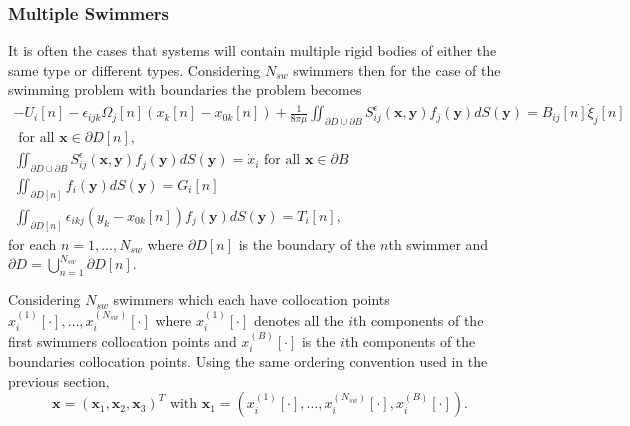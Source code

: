 \subsubsection{Multiple Swimmers} \label{sec:multipleSwimmers}
It is often the cases that systems will contain multiple rigid bodies of either the same type or different types. Considering $N_{sw}$ swimmers then for the case of the swimming problem with boundaries the problem becomes
\begin{equation}
\label{eq:swimmingProblemMulti}
\begin{gathered}
    -U_{i}[n]-\epsilon_{i j k} \Omega_{j}[n]\left(x_{k}[n]-x_{0 k}[n]\right)+\frac{1}{8 \pi\mu} \iint_{\partial D \cup \partial B} S_{i j}^{\epsilon}(\bm{x}, \bm{y}) f_{j}(\bm{y}) d S({\bm{y}})=B_{i j}[n] \dot{\xi}_{j}[n] \\ \text { for all } \bm{x} \in \partial D[n], \\
    \iint_{\partial D \cup \partial B} S_{i j}^{\epsilon}(\bm{x}, \bm{y}) f_{j}(\bm{y}) d S({\bm{y}}) = \dot{x}_i \text { for all } \bm{x} \in \partial B \\
    \iint_{\partial D[n]} f_{i}(\bm{y}) d S({\bm{y}})=G_i[n] \\
    \iint_{\partial D[n]} \epsilon_{i k j} (y_{k}-x_{0 k}[n]) f_{j}(\bm{y}) d S({\bm{y}})=T_i[n],
\end{gathered}
\end{equation}
for each $n=1,\dots,N_{sw}$ where $\partial D[n]$ is the boundary of the $n$th swimmer and $\partial D = \bigcup_{n=1}^{N_{sw}} \partial D[n]$.

Considering $N_{sw}$ swimmers which each have collocation points $x_i^{(1)}[\cdot],\dots,x_i^{(N_{sw})}[\cdot]$ where $x_i^{(1)}[\cdot]$ denotes all the $i$th components of the first swimmers collocation points and $x_i^{(B)}[\cdot]$ is the $i$th components of the boundaries collocation points. Using the same ordering convention used in the previous section,
\begin{equation*}
    \bm{x} = (\bm{x}_1,\bm{x}_2,\bm{x}_3)^T \text{ with } \bm{x}_1=(x_i^{(1)}[\cdot],\dots,x_i^{(N_{sw})}[\cdot],x_i^{(B)}[\cdot]).
\end{equation*}

